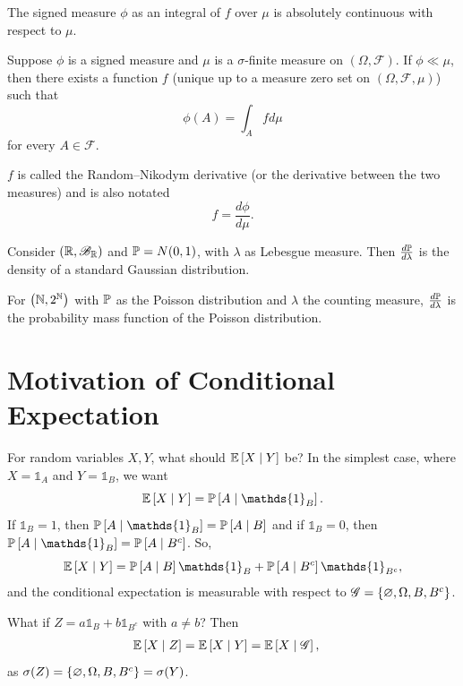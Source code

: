 \begin{remark}
	The signed measure $\phi$ as an integral of $f$ over $\mu$ is absolutely continuous with respect to $\mu$.
\end{remark}

\begin{theorem}
	Suppose $\phi$ is a signed measure and $\mu$ is a $\sigma$-finite measure on $(\Omega, \mathscr{F})$. If $\phi \ll \mu$, then there exists a function $f$ (unique up to a measure zero set on $(\Omega, \mathscr{F},\mu)$) such that \[
		\phi(A) = \int_A fd\mu
	\] for every $A \in \mathscr{F}$.

	$f$ is called the Random--Nikodym derivative (or the derivative between the two measures) and is also notated \[
		f = \frac{d \phi}{d\mu}
	.\] 
\end{theorem}
\begin{example}
	Consider $\left( \R, \mathscr{B}_\R \right)$ and $\P = N(0,1)$, with $\lambda$ as Lebesgue measure. Then $\frac{d\P}{d\lambda}$ is the density of a standard Gaussian distribution.

	For $\left( \N, 2^{\N} \right)$ with $\P$ as the Poisson distribution and $\lambda$ the counting measure, $\frac{d\P}{d\lambda}$ is the probability mass function of the Poisson distribution.
\end{example}

\section{Motivation of Conditional Expectation}

For random variables $X,Y$, what should $\E\left[X \mid Y\right] $ be? In the simplest case, where $X = \mathds{1}_{A}$ and $Y = \mathds{1}_{B}$, we want \[
	\E\left[X \mid Y\right]  = \P\left[A \mid \mathds{1}_{B}\right] 
.\] If $\mathds{1}_{B}=  1$, then $\P\left[A \mid \mathds{1}_{B}\right] = \P\left[A \mid B\right] $ and if $\mathds{1}_{B} = 0$, then $\P\left[A \mid \mathds{1}_{B}\right]  = \P\left[A \mid B^{c}\right] $. So,
\begin{equation} \label{3-3-9}
	\E\left[X \mid Y\right] = \P\left[A \mid B\right] \mathds{1}_{B} + \P\left[A \mid B^{c}\right] \mathds{1}_{B^{c}}
,\end{equation} 
and the conditional expectation is measurable with respect to $\mathscr{G} = \left\{\O, \Omega, B, B^{c}\right\}$.

What if $Z = a \mathds{1}_{B} + b \mathds{1}_{B^{c}}$ with $a \ne b$? Then
\begin{align*}
	\E\left[X \mid Z\right] 
	&= \E\left[X \mid Y\right] = \E\left[X \mid \mathscr{G}\right] 	
,\end{align*}
as $\sigma(Z) = \left\{\O, \Omega, B, B^{c}\right\} = \sigma(Y)$.

